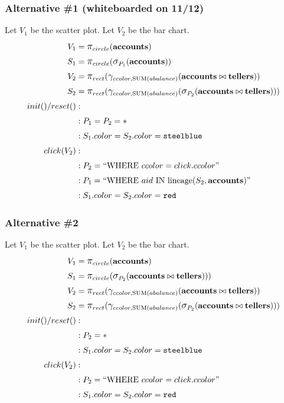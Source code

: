 \documentclass[fleqn]{sigplanconf}
\begin{document}
\subsubsection{Alternative \#1 (whiteboarded on 11/12)}
Let $V_1$ be the scatter plot.
Let $V_2$ be the bar chart.
\begin{align*}
	V_1&= \mathlarger{\pi}_{circle}(\bf{accounts})\\
	S_1&= \mathlarger{\pi}_{circle}(\mathlarger{\sigma}_{P_1}(\bf{accounts}))\\
	V_2&= \mathlarger{\pi}_{rect}(\mathlarger{\gamma}_{ccolor, \text{SUM}(abalance)}(\bf{accounts}\bowtie{}\bf{tellers}))\\
	S_2&= \mathlarger{\pi}_{rect}(\mathlarger{\gamma}_{ccolor, \text{SUM}(abalance)}(\mathlarger{\sigma}_{P_2}(\bf{accounts}\bowtie{}\bf{tellers})))\\
	init()/reset()&:\\
	&: P_1 = P_2 = *\\
	&: S_1.color = S_2.color = \texttt{steelblue}\\
	click(V_2)&:\\
	&: P_2 = ``\text{WHERE}~ccolor=click.ccolor"\\
	&: P_1 = ``\text{WHERE}~aid~\text{IN~lineage}(S_2, \bf{accounts})"\\
	&: S_1.color = S_2.color = \texttt{red}\\
\end{align*}
\subsubsection{Alternative \#2}
Let $V_1$ be the scatter plot.
Let $V_2$ be the bar chart.
\begin{align*}
	V_1&= \mathlarger{\pi}_{circle}(\bf{accounts})\\
	S_1&= \mathlarger{\pi}_{circle}(\mathlarger{\sigma}_{P_2}(\bf{accounts}\bowtie{}\bf{tellers})))\\
	V_2&= \mathlarger{\pi}_{rect}(\mathlarger{\gamma}_{ccolor, \text{SUM}(abalance)}(\bf{accounts}\bowtie{}\bf{tellers}))\\
	S_2&= \mathlarger{\pi}_{rect}(\mathlarger{\gamma}_{ccolor, \text{SUM}(abalance)}(\mathlarger{\sigma}_{P_2}(\bf{accounts}\bowtie{}\bf{tellers})))\\
	init()/reset()&:\\
	&: P_2 = *\\
	&: S_1.color = S_2.color = \texttt{steelblue}\\
	click(V_2)&:\\
	&: P_2 = ``\text{WHERE}~ccolor=click.ccolor"\\
	&: S_1.color = S_2.color = \texttt{red}\\
\end{align*}
\end{document}
